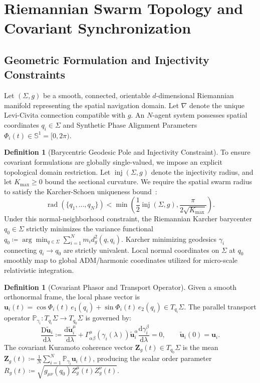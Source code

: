 \documentclass[11pt,a4paper,reqno]{article}
\theoremstyle{plain}
\theoremstyle{definition}
\newtheorem{definition}[theorem]{Definition}
\theoremstyle{remark}
\numberwithin{equation}{section}
\begin{document}
\bigskip
\section{Riemannian Swarm Topology and Covariant Synchronization}
\label{sec:riemannian_topology}

\subsection{Geometric Formulation and Injectivity Constraints}
Let $(\Sigma, g)$ be a smooth, connected, orientable $d$-dimensional Riemannian manifold representing the spatial navigation domain. Let $\nabla$ denote the unique Levi-Civita connection compatible with $g$. An $N$-agent system possesses spatial coordinates $q_i \in \Sigma$ and Synthetic Phase Alignment Parameters $\Phi_i(t) \in \mathbb{S}^1 = [0, 2\pi)$.

\begin{definition}[Barycentric Geodesic Pole and Injectivity Constraint]
\label{def:barycenter}
To ensure covariant formulations are globally single-valued, we impose an explicit topological domain restriction. Let $\operatorname{inj}(\Sigma, g)$ denote the injectivity radius, and let $K_{\max} \ge 0$ bound the sectional curvature. We require the spatial swarm radius to satisfy the Karcher-Schoen uniqueness bound~\cite{Karcher1977}:
\begin{equation}
\operatorname{rad}(\{q_1, \dots, q_N\}) < \min\left( \frac{1}{2} \operatorname{inj}(\Sigma, g), \frac{\pi}{2\sqrt{K_{\max}}} \right).
\end{equation}
Under this normal-neighborhood constraint, the Riemannian Karcher barycenter $q_0 \in \Sigma$ strictly minimizes the variance functional $q_0 \coloneqq \arg\min_{q \in \Sigma} \sum_{i=1}^N m_i d_g^2(q, q_i)$. Karcher minimizing geodesics $\gamma_i$ connecting $q_i \to q_0$ are strictly univalent. Local normal coordinates on $\Sigma$ at $q_0$ smoothly map to global ADM/harmonic coordinates utilized for micro-scale relativistic integration.
\end{definition}

\begin{definition}[Covariant Phasor and Transport Operator]
Given a smooth orthonormal frame, the local phase vector is $\bm{u}_i(t) = \cos \Phi_i(t) \, e_1(q_i) + \sin \Phi_i(t) \, e_2(q_i) \in T_{q_i}\Sigma$. The parallel transport operator $\mathbb{P}_{\gamma_i}: T_{q_i}\Sigma \to T_{q_0}\Sigma$ is governed by:
\begin{equation}
\frac{\mathrm{D} \widetilde{\bm{u}}_i}{\mathrm{d}\lambda} \coloneqq \frac{\mathrm{d} \widetilde{\bm{u}}_i^\mu}{\mathrm{d}\lambda} + \Gamma^\mu_{\alpha\beta}(\gamma_i(\lambda)) \widetilde{\bm{u}}_i^\alpha \frac{\mathrm{d}\gamma_i^\beta}{\mathrm{d}\lambda} = 0, \qquad \widetilde{\bm{u}}_i(0) = \bm{u}_i.
\end{equation}
The covariant Kuramoto coherence vector $\bm{Z}_g(t) \in T_{q_0}\Sigma$ is the mean $\bm{Z}_g(t) \coloneqq \frac{1}{N} \sum_{i=1}^N \mathbb{P}_{\gamma_i} \bm{u}_i(t)$, producing the scalar order parameter $R_g(t) \coloneqq \sqrt{g_{\mu\nu}(q_0) Z_g^\mu(t) Z_g^\nu(t)}$.
\end{definition}
\end{document}
